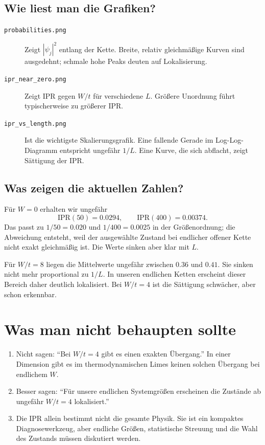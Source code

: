 \documentclass[11pt,a4paper]{article}
\begin{document}
\subsection{Wie liest man die Grafiken?}
\begin{description}
 \item[\texttt{probabilities.png}] Zeigt $|\psi_j|^2$ entlang der Kette.
 Breite, relativ gleichmäßige Kurven sind ausgedehnt; schmale hohe Peaks
 deuten auf Lokalisierung.
 \item[\texttt{ipr\_near\_zero.png}] Zeigt IPR gegen $W/t$ für verschiedene
 $L$. Größere Unordnung führt typischerweise zu größerer IPR.
 \item[\texttt{ipr\_vs\_length.png}] Ist die wichtigste Skalierungsgrafik.
 Eine fallende Gerade im Log-Log-Diagramm entspricht ungefähr $1/L$.
 Eine Kurve, die sich abflacht, zeigt Sättigung der IPR.
\end{description}

\subsection{Was zeigen die aktuellen Zahlen?}
Für $W=0$ erhalten wir ungefähr
\[
 \mathrm{IPR}(50)=0.0294,\qquad
 \mathrm{IPR}(400)=0.00374.
\]
Das passt zu $1/50=0.020$ und $1/400=0.0025$ in der Größenordnung; die
Abweichung entsteht, weil der ausgewählte Zustand bei endlicher offener Kette
nicht exakt gleichmäßig ist. Die Werte sinken aber klar mit $L$.

Für $W/t=8$ liegen die Mittelwerte ungefähr zwischen $0.36$ und $0.41$.
Sie sinken nicht mehr proportional zu $1/L$. In unseren endlichen Ketten
erscheint dieser Bereich daher deutlich lokalisiert. Bei $W/t=4$ ist die
Sättigung schwächer, aber schon erkennbar.

\section{Was man nicht behaupten sollte}
\begin{enumerate}
 \item Nicht sagen: ``Bei $W/t=4$ gibt es einen exakten Übergang.'' In
 einer Dimension gibt es im thermodynamischen Limes keinen solchen
 Übergang bei endlichem $W$.
 \item Besser sagen: ``Für unsere endlichen Systemgrößen erscheinen die
 Zustände ab ungefähr $W/t=4$ lokalisiert.''
 \item Die IPR allein bestimmt nicht die gesamte Physik. Sie ist ein
 kompaktes Diagnosewerkzeug, aber endliche Größen, statistische Streuung und
 die Wahl des Zustands müssen diskutiert werden.
\end{enumerate}
\end{document}
